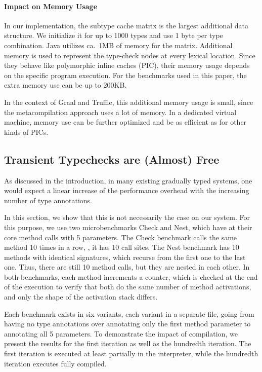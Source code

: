 \paragraph*{Impact on Memory Usage}

In our implementation, the subtype cache matrix is the largest additional
data structure.
We initialize it for up to 1000 types and use 1 byte per type combination.
Java utilizes ca.\ 1MB of memory for the matrix.
Additional memory is used to represent the type-check nodes at every lexical location.
Since they behave like polymorphic inline caches (PIC)\citep{Hoelzle:91:PIC},
their memory usage depends on the specific program execution.
For the benchmarks used in this paper, the extra memory use can be up to 200KB.

In the context of Graal and Truffle, this additional memory usage is small,
since the metacompilation approach uses a lot of memory\citep{Marr:2015:MTPE}.
In a dedicated virtual machine,
memory use can be further optimized and be as efficient as for other kinds of PICs.


\subsection{Transient Typechecks are (Almost) Free}
\label{sec:eval-best-case}

As discussed in the introduction, in many existing gradually typed systems,
one would expect a linear increase of the performance overhead
with the increasing number of type annotations.

In this section, we show that this is not necessarily the case on our system.
For this purpose, we use two microbenchmarks Check and Nest,
which have at their core method calls with 5 parameters.
The Check benchmark calls the same method 10 times in a row, \ie, it has 10 call sites.
The Nest benchmark has 10 methods with identical signatures,
which recurse from the first one to the last one.
Thus, there are still 10 method calls, but they are nested in each other.
In both benchmarks, each method increments a counter,
which is checked at the end of the execution to verify that both do the same
number of method activations, and only the shape of the activation stack differs.

Each benchmark exists in six variants, each variant in a separate file,
going from having no type annotations
over annotating only the first method parameter to annotating all 5 parameters.
To demonstrate the impact of compilation,
we present the results for the first iteration as well as the hundredth iteration.
The first iteration is executed at least partially in the interpreter,
while the hundredth iteration executes fully compiled.

